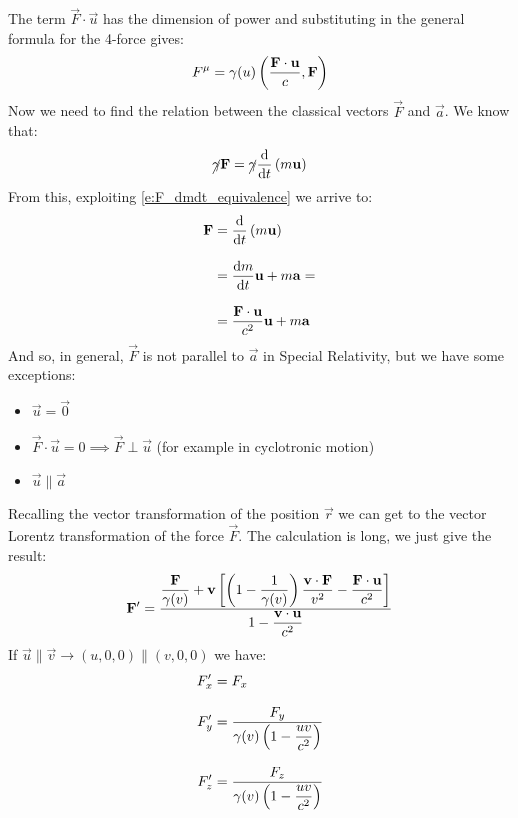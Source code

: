 The term $\vec{F}\cdot\vec{u}$ has the dimension of power and substituting in the general formula for the 4-force gives:
\begin{equation}
  F^{\mu} = \gamma (u) \left(\dfrac{\vb{F}\cdot\vb{u}}{c}, \vb{F}\right)
\end{equation}
Now we need to find the relation between the classical vectors $\vec{F}$ and $\vec{a}$. We know that:
\begin{equation}
  \cancel{\gamma} \vec{F} = \cancel{\gamma} \dv{}{t}\brackets{m\vec{u}}
\end{equation}
From this, exploiting \eqref{e:F_dmdt_equivalence} we arrive to:
\begin{equation}
  \begin{split}
    \vec{F} &= \dv{}{t}\brackets{m\vec{u}} \\[8pt]
    &= \dv{m}{t}\vec{u} + m\vec{a} = \\[8pt]
    &= \dfrac{\vec{F}\cdot\vec{u}}{c^2}\vec{u} + m\vec{a}
  \end{split}
\end{equation}
And so, in general, $\vec{F}$ is not parallel to $\vec{a}$ in Special Relativity, but we have some exceptions:
\begin{itemize}
  \item $\vec{u} = \vec{0}$
  \item $\vec{F}\cdot\vec{u} = 0 \implies \vec{F} \perp \vec{u}$ (for example in cyclotronic motion)
  \item $\vec{u} \parallel \vec{a}$
\end{itemize}
Recalling the vector transformation of the position $\vec{r}$ we can get to the vector Lorentz transformation of the force $\vec{F}$. The calculation is long, we just give the result:
\begin{equation}
  \vb{F}' = \dfrac{\dfrac{\vb{F}}{\gamma (v)} + \vb{v}\left[\left(1- \dfrac{1}{\gamma(v)}\right)\dfrac{\vb{v}\cdot \vb{F}}{v^2}-\dfrac{\vb{F}\cdot \vb{u}}{c^2}\right]}{1-\dfrac{\vb{v}\cdot\vb{u}}{c^2}}
\end{equation}
If $\vec{u} \parallel \vec{v} \rightarrow (u, 0, 0) \parallel (v, 0, 0)$ we have:
\begin{equation}
  \begin{split}
    F'_x &= F_x \\[8pt]
    F'_y &= \dfrac{F_y}{\gamma(v)\left(1-\dfrac{uv}{c^2}\right)}\\[8pt]
    F'_z &= \dfrac{F_z}{\gamma(v)\left(1-\dfrac{uv}{c^2}\right)}
  \end{split}
\end{equation}
